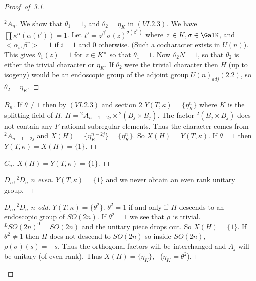 \documentclass{memo-l}
\theoremstyle{definition}
\theoremstyle{remark}
\numberwithin{section}{chapter}
\numberwithin{equation}{chapter}
\begin{document}
\begin{proof}[Proof\ of\ 3.1]
\begin{proof}[${}^{2}A_{n}$]
   We show that ${\theta}_{1} = 1$, and ${\theta}_{2}  =  {\eta}_{K}$ in
$(VI.2.3)$.  We have $\prod{\kappa}^{{\alpha}}({\alpha}(t'))  =  1$.  Let $t'
 =  z^{{\beta}^{v}} {\sigma}(z)^{ {\sigma}({\beta}^{v})}$ where $z
 \in  K, {\sigma}  \in  \GalK$, and $<{\alpha}_{i},{\beta}^{v}>  =  1$ if
$i = 1$ and $0$ otherwise.  (Such a cocharacter exists in $U(n))$.  This
gives ${\theta}_{1}(z)  =  1$ for $z  \in  K^{\times}$ so that ${\theta}_{1}  =  1$.
Now ${\theta}_{2} N  =  1$, so that ${\theta}_{2}$ is either the trivial
character or ${\eta}_{K}$.  If ${\theta}_{2}$ were the trivial character
then $H$ (up to isogeny) would be an endoscopic group
of the adjoint group $U(n)_{adj} (2.2)$, so ${\theta}_{2}  =  {\eta}_{K}$.
\phantom\qedhere
\end{proof}


\begin{proof}[$B_{n}$] If ${\theta} \ne 1$ then by $(VI.2.3)$ and section 2
$Y(T,{\kappa}) = \{{\eta}_{K}^{n}\}$ where $K$ is the splitting field of $H$.
$H  =  {}^{2}A_{n-1-2j} \times {}^{2}(B_{j} \times B_{j})$.  The factor
${}^{2}(B_{j} \times B_{j})$ does not contain any $F$-rational subregular
elements.  Thus the character comes from ${}^{2}A_{n-1-2j}$ and $X(H)  =
\{{\eta}_{K}^{n-2j}\}  =  \{{\eta}_{K}^{n}\}$.  So $X(H)  =  Y(T,{\kappa})$.
If ${\theta} = 1$ then $Y(T,{\kappa}) = X(H) = \{1\}$.
\phantom\qedhere
\end{proof}

\begin{proof}[$C_{n}$]
$X(H)  =  Y(T,{\kappa})  =  \{1\}$.
\phantom\qedhere
\end{proof}


\begin{proof}[$D_{n},{}^{2}D_{n}$  $n$ even]  $Y(T,{\kappa})  =  \{1\}$ and we never
obtain an even rank unitary group.
\phantom\qedhere
\end{proof}


\begin{proof}[$D_{n},{}^{2}D_{n}$ $n$ odd]  $Y(T,{\kappa})  =  \{{\theta}^{2}\}$.
${\theta}^{2} = 1$ if and only if $H$ descends to an endoscopic group of
$SO(2n)$.  If ${\theta}^{2} = 1$ we see that ${\rho }$ is trivial.
${}^{L}SO(2n)^{0}  =  SO(2n)$ and the unitary piece drops out.  So $X(H)  =
\{1\}$.  If ${\theta}^{2} \ne 1$ then $H$ does not descend to $SO(2n)$ so
inside $SO(2n)$, \  ${\rho }({\sigma})(s)  =  -s$.  Thus the orthogonal factors
will be interchanged and $A_{j}$ will be unitary (of even rank).  Thus
$X(H)  =  \{{\eta}_{K}\}$, \  (${\eta}_{K}  =  {\theta}^{2}$).
\phantom\qedhere
\end{proof}


\end{proof}
\end{document}
